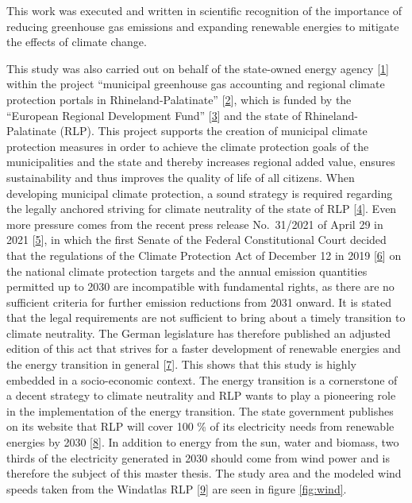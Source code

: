 \documentclass[a4paper,11pt]{article}
\begin{document}
This work was executed and written in scientific recognition of the importance of reducing greenhouse gas emissions and expanding renewable energies to mitigate the effects of climate change.

This study was also carried out on behalf of the state-owned energy agency {[}\protect\hyperlink{ref-EnergieagenturRheinlandPfalz.2021}{1}{]} within the project ``municipal greenhouse gas accounting and regional climate protection portals in Rhineland-Palatinate'' {[}\protect\hyperlink{ref-KomBiReK.2021}{2}{]}, which is funded by the ``European Regional Development Fund'' {[}\protect\hyperlink{ref-EuropeanRegionalDevelopmentFund.2021}{3}{]} and the state of Rhineland-Palatinate (RLP). This project supports the creation of municipal climate protection measures in order to achieve the climate protection goals of the municipalities and the state and thereby increases regional added value, ensures sustainability and thus improves the quality of life of all citizens. When developing municipal climate protection, a sound strategy is required regarding the legally anchored striving for climate neutrality of the state of RLP {[}\protect\hyperlink{ref-RheinlandPfalz.19.08.2014}{4}{]}. Even more pressure comes from the recent press release No.~31/2021 of April 29 in 2021 {[}\protect\hyperlink{ref-Bundesverfassungsgericht.24.03.2021}{5}{]}, in which the first Senate of the Federal Constitutional Court decided that the regulations of the Climate Protection Act of December 12 in 2019 {[}\protect\hyperlink{ref-BundesamtfurJustiz.2019}{6}{]} on the national climate protection targets and the annual emission quantities permitted up to 2030 are incompatible with fundamental rights, as there are no sufficient criteria for further emission reductions from 2031 onward. It is stated that the legal requirements are not sufficient to bring about a timely transition to climate neutrality. The German legislature has therefore published an adjusted edition of this act that strives for a faster development of renewable energies and the energy transition in general {[}\protect\hyperlink{ref-BundesministeriumfurUmweltNaturschutzundnukleareSicherheit.12.05.2021}{7}{]}. This shows that this study is highly embedded in a socio-economic context. The energy transition is a cornerstone of a decent strategy to climate neutrality and RLP wants to play a pioneering role in the implementation of the energy transition. The state government publishes on its website that RLP will cover 100 \% of its electricity needs from renewable energies by 2030 {[}\protect\hyperlink{ref-LandesregierungRheinlandPfalz.2021}{8}{]}. In addition to energy from the sun, water and biomass, two thirds of the electricity generated in 2030 should come from wind power and is therefore the subject of this master thesis. The study area and the modeled wind speeds taken from the Windatlas RLP {[}\protect\hyperlink{ref-MinisteriumfurWirtschaftKlimaschutzEnergieundLandesplanung.2013}{9}{]} are seen in figure \ref{fig:wind}.
\end{document}
